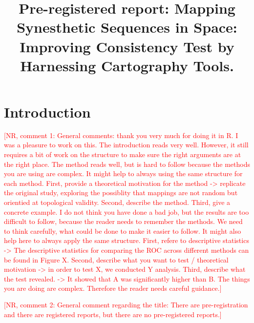 \documentclass[
  man,
  longtable,
  a4paper,
  nolmodern,
  notxfonts,
  notimes,
  colorlinks=true,linkcolor=blue,citecolor=blue,urlcolor=blue]{apa7}
\title{Pre-registered report: Mapping Synesthetic Sequences in Space:
Improving Consistency Test by Harnessing Cartography Tools.}
\affiliation{
{Psychology, UniDistance Suisse}}
\begin{document}
\maketitle



\setcounter{secnumdepth}{3}

\setlength\LTleft{0pt}

\resetlinenumber[1]



\section{Introduction}\label{sec-introduction}

\textcolor{red}{[NR, comment 1: General comments: thank you very much for doing it in R. I was a pleasure to work on this. The introduction reads very well. However, it still requires a bit of work on the structure to make sure the right arguments are at the right place. The method reads well, but is hard to follow because the methods you are using are complex. It might help to always using the same structure for each method. First, provide a theoretical motivation for the method -> replicate the original study, exploring the possiblity that mappings are not random but orientied at topological validity. Second, describe the method. Third, give a concrete example. I do not think you have done a bad job, but the results are too difficult to follow, because the reader needs to remember the methods. We need to think carefully, what could be done to make it easier to follow. It might also help here to always apply the same structure. First, refere to descriptive statistics -> The descriptive statistics for comparing the ROC across different methods can be found in Figure X. Second, describe what you want to test / theoretical motivation -> in order to test X, we conducted Y analysis. Third, describe what the test revealed. -> It showed that A was significantly higher than B. The things you are doing are complex. Therefore the reader needs careful guidance.]}

\textcolor{red}{[NR, comment 2: General comment regarding the title: There are pre-registration and there are registered reports, but there are no pre-registered reports.]}
\end{document}

